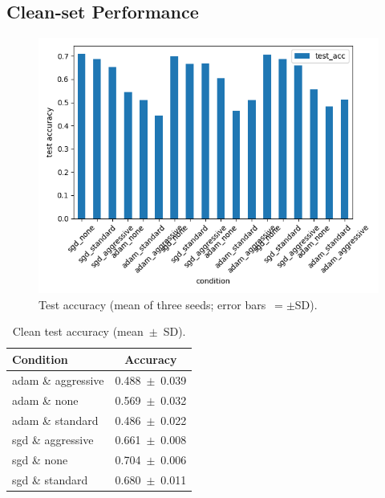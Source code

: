 \documentclass{article}
\begin{document}
\subsection{Clean‑set Performance}
\begin{figure}[ht]
  \centering
  \includegraphics[width=0.8\linewidth]{test_acc_comparison.png}
  \caption{Test accuracy (mean of three seeds; error bars $=\pm$SD).}
  \label{fig:testacc}
\end{figure}

\begin{table}[ht]
  \centering
  \caption{Clean test accuracy (mean $\pm$ SD).}
  \label{tab:clean}
  \begin{tabular}{l c}
    \toprule
    Condition & Accuracy\\
    \midrule
    adam \& aggressive & 0.488 $\pm$ 0.039\\
    adam \& none       & 0.569 $\pm$ 0.032\\
    adam \& standard   & 0.486 $\pm$ 0.022\\
    sgd  \& aggressive & 0.661 $\pm$ 0.008\\
    sgd  \& none       & 0.704 $\pm$ 0.006\\
    sgd  \& standard   & 0.680 $\pm$ 0.011\\
    \bottomrule
  \end{tabular}
\end{table}
\end{document}

